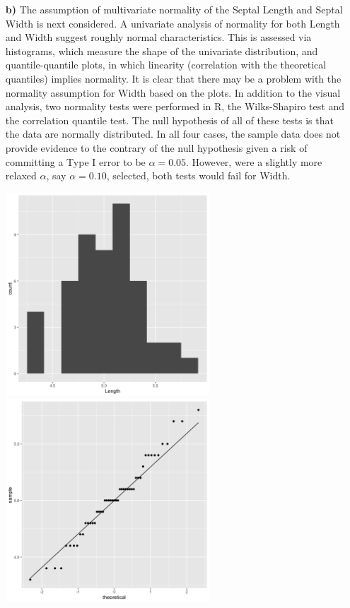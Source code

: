 \begin{enumerate}
\item[\bf{b)}]
	The assumption of multivariate normality of the Septal Length and Septal Width is next considered. A univariate analysis of normality for both Length and Width suggest roughly normal characteristics. This is assessed via histograms, which measure the shape of the univariate distribution, and quantile-quantile plots, in which linearity (correlation with the theoretical quantiles) implies normality. It is clear that there may be a problem with the normality assumption for Width based on the plots. In addition to the visual analysis, two normality tests were performed in R, the Wilks-Shapiro test and the correlation quantile test. The null hypothesis of all of these tests is that the data are normally distributed. In all four cases, the sample data does not provide evidence to the contrary of the null hypothesis given a risk of committing a Type I error to be $\alpha = 0.05$. However, were a slightly more relaxed $\alpha$, say $\alpha = 0.10$, selected, both tests would fail for Width.
	\begin{center}
		\includegraphics[width=3in]{plot_4_b_L_hist.png}
		\includegraphics[width=3in]{plot_4_b_L_qq.png}

\end{center}
\end{enumerate}
